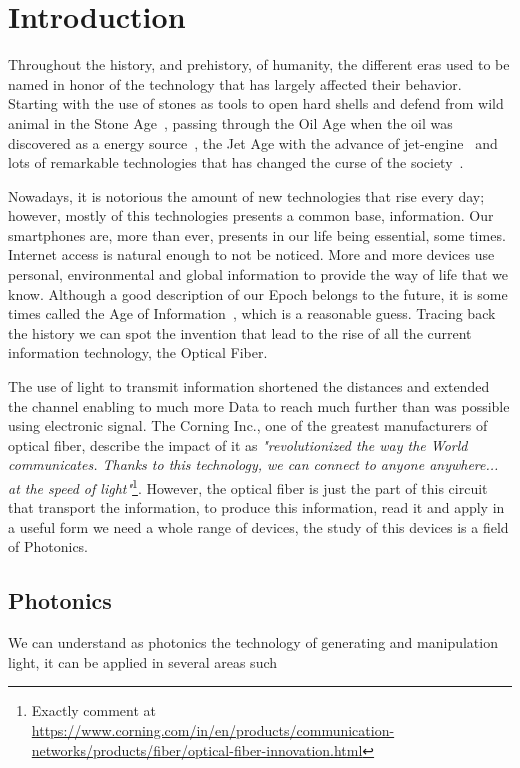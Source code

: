 \chapter{Introduction}

Throughout the history, and prehistory, of humanity, the different eras used to be named in honor of the technology that has largely affected their behavior. Starting with the use of stones as tools to open hard shells and defend from wild animal in the Stone Age~\cite{livescience_2011}, passing through the Oil Age when the oil was discovered as a energy source~\cite{Maugeri_2007}, the Jet Age with the advance of jet-engine~\cite{brit_fly} and lots of remarkable technologies that has changed the curse of the society~\cite{brit_tec}.

Nowadays, it is notorious the amount of new technologies that rise every day; however, mostly of this technologies presents a common base, information. Our smartphones are, more than ever, presents in our life being essential, some times. Internet access is natural enough to not be noticed. More and more devices use personal, environmental and global information to provide the way of life that we know. Although a good description of our Epoch belongs to the future, it is some times called the Age of Information~\cite{TechTarget, NYT_2012, Forbes}, which is a reasonable guess. Tracing back the history we can spot the invention that lead to the rise of all the current information technology, the Optical Fiber.

The use of light to transmit information shortened the distances and extended the channel enabling to much more Data to reach much further than was possible using electronic signal. The Corning Inc., one of the greatest manufacturers of optical fiber, describe the impact of it as \textit{"revolutionized the way the World communicates. Thanks to this technology, we can connect to anyone anywhere... at the speed of light"}\footnote{Exactly comment at \url{https://www.corning.com/in/en/products/communication-networks/products/fiber/optical-fiber-innovation.html}}. However, the optical fiber is just the part of this circuit that transport the information, to produce this information, read it and apply in a useful form we need a whole range of devices, the study of this devices is a field of Photonics.

\section{Photonics}
We can understand as photonics the technology of generating and manipulation light, it can be applied in several areas such 



